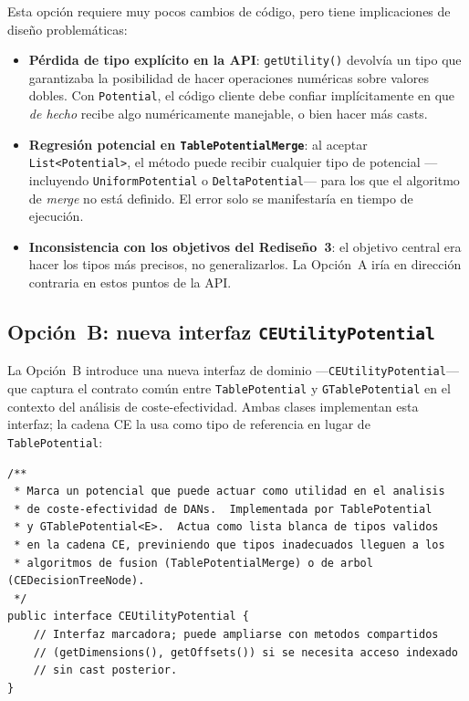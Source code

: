 \documentclass[11pt,a4paper]{article}
\newcommand{\code}[1]{\texttt{#1}}
\begin{document}
Esta opción requiere muy pocos cambios de código, pero tiene implicaciones
de diseño problemáticas:

\begin{itemize}
  \item \textbf{Pérdida de tipo explícito en la API}: \code{getUtility()}
        devolvía un tipo que garantizaba la posibilidad de hacer operaciones
        numéricas sobre valores dobles.  Con \code{Potential}, el código
        cliente debe confiar implícitamente en que \emph{de hecho} recibe
        algo numéricamente manejable, o bien hacer más casts.

  \item \textbf{Regresión potencial en \code{TablePotentialMerge}}: al
        aceptar \code{List<Potential>}, el método puede recibir cualquier
        tipo de potencial ---incluyendo \code{UniformPotential} o
        \code{DeltaPotential}--- para los que el algoritmo de \emph{merge}
        no está definido.  El error solo se manifestaría en tiempo de
        ejecución.

  \item \textbf{Inconsistencia con los objetivos del Rediseño~3}: el
        objetivo central era hacer los tipos más precisos, no generalizarlos.
        La Opción~A iría en dirección contraria en estos puntos de la API.
\end{itemize}

\subsection{Opción~B: nueva interfaz \code{CEUtilityPotential}}
\label{sec:gtable-opcionB}

La Opción~B introduce una nueva interfaz de dominio ---\code{CEUtilityPotential}---
que captura el contrato común entre \code{TablePotential} y
\code{GTablePotential} en el contexto del análisis de coste-efectividad.
Ambas clases implementan esta interfaz; la cadena CE la usa como tipo de
referencia en lugar de \code{TablePotential}:

\begin{lstlisting}[caption={Nueva interfaz \code{CEUtilityPotential} (Opción~B)}]
/**
 * Marca un potencial que puede actuar como utilidad en el analisis
 * de coste-efectividad de DANs.  Implementada por TablePotential
 * y GTablePotential<E>.  Actua como lista blanca de tipos validos
 * en la cadena CE, previniendo que tipos inadecuados lleguen a los
 * algoritmos de fusion (TablePotentialMerge) o de arbol (CEDecisionTreeNode).
 */
public interface CEUtilityPotential {
    // Interfaz marcadora; puede ampliarse con metodos compartidos
    // (getDimensions(), getOffsets()) si se necesita acceso indexado
    // sin cast posterior.
}
\end{lstlisting}
\end{document}
